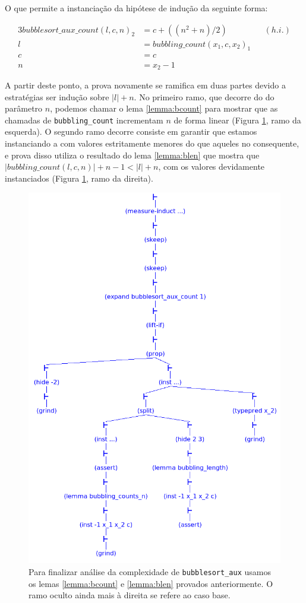 O que permite a instanciação da hipótese de indução da seguinte forma:

\begin{alignat*}{3}
bubblesort\_aux\_count(l, c, n)_2 &= c + ((n ^ 2 + n) / 2) && (h.i.)\\
l &= bubbling\_count(x_1, c, x_2)_1 \\
c &= c \\
n &= x_2-1
\end{alignat*}

A partir deste ponto, a prova novamente se ramifica em duas partes devido
a estratégias ser indução sobre $|l| + n$. No primeiro ramo, que decorre do
do parâmetro $n$, podemos chamar o lema \ref{lemma:bcount} para mostrar que
as chamadas de \texttt{bubbling\_count} incrementam $n$ de forma linear
(Figura \ref{fig:bubaux1}, ramo da esquerda). O segundo ramo decorre
consiste em garantir que estamos instanciando a \HI com valores
estritamente menores do que aqueles no consequente, e prova disso
utiliza o resultado do lema \ref{lemma:blen} que mostra que
$|bubbling\_count(l,c,n)| + n - 1 < |l| + n$, com os valores devidamente
instanciados (Figura \ref{fig:bubaux1}, ramo da direita).

\begin{figure}[H]
    \centering
    \includegraphics[width=0.75\linewidth,trim={2.5cm 0cm 3.5cm 12cm},clip]{figures/bubaux-counts-n2.png}
    \caption{Para finalizar análise da complexidade de
    \texttt{bubblesort\_aux} usamos os lemas \ref{lemma:bcount}
    e  \ref{lemma:blen} provados anteriormente. O ramo oculto
    ainda mais à direita se refere ao caso base.}
    \label{fig:bubaux1}
\end{figure}

